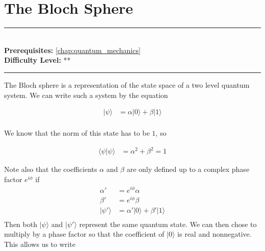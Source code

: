 \documentclass[book.tex]{subfiles}
\begin{document}
\chapter{The Bloch Sphere}

\label{chap:bloch_sphere}
\noindent\rule{11cm}{0.4pt} \\
\textbf{Prerequisites:} \autoref{chap:quantum_mechanics} \\
\textbf{Difficulty Level:} ** \\
\noindent\rule{11cm}{0.4pt}
\vspace{5mm}

The Bloch sphere is a representation of the state space of a two level quantum system. We can write such a system by the equation

\begin{align}
    |\psi \rangle &= \alpha | 0 \rangle + \beta | 1 \rangle \\
\end{align}

We know that the norm of this state has to be $1$, so

\begin{align}
    \langle \psi | \psi \rangle &= \alpha^2 + \beta^2 = 1
\end{align}

Note also that the coefficients $\alpha$ and $\beta$ are only defined up to a complex phase factor $e^{i\phi}$ if
\begin{align}
    \alpha' &= e^{i\phi} \alpha \\
    \beta' &= e^{i \phi} \beta \\
    |\psi' \rangle &= \alpha' |0 \rangle + \beta' | 1 \rangle \\
\end{align}
Then both $|\psi \rangle$ and $|\psi' \rangle$ represent the same quantum state. We can then chose to multiply by a phase factor so that the coefficient of $|0 \rangle$ is real and nonnegative. This allows us to write
\end{document}
